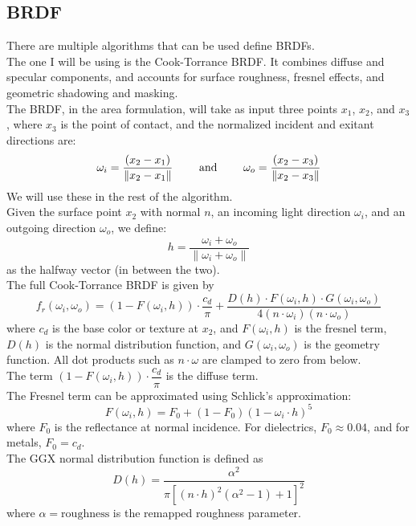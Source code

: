\documentclass[12pt]{article}
\begin{document}
\newpage

\subsection*{BRDF}

There are multiple algorithms that can be used define
BRDFs. \\
The one I will be using is the Cook-Torrance BRDF.
It combines diffuse and specular components, 
and accounts for surface roughness, 
fresnel effects, and geometric shadowing and masking. \\

The BRDF, in the area formulation, will take as input
three points $x_1$, $x_2$, and $x_3$,
where $x_3$ is the point of contact, and
the normalized incident and exitant directions are:
\[ \omega_i = \dfrac{(x_2 - x_1)}{\|x_2 - x_1\|} 
\qquad \text{ and } \qquad 
\omega_o = \dfrac{(x_2 - x_3)}{\|x_2 - x_3\|} \]
We will use these in the rest of the algorithm. \\

Given the surface point $x_2$ with normal $n$, 
an incoming light direction $\omega_i$, 
and an outgoing direction $\omega_o$, 
we define:
\[ h = \frac{\omega_i + \omega_o}
{\|\omega_i + \omega_o\|} \]
as the halfway vector (in between the two). \\

The full Cook-Torrance BRDF is given by
\[f_r(\omega_i, \omega_o) = (1 - F(\omega_i, h)) 
\cdot \frac{c_d}{\pi}
+ \frac{D(h) \cdot F(\omega_i, h) \cdot 
G(\omega_i, \omega_o)}{4 (n \cdot \omega_i)
(n \cdot \omega_o)} \]
where $c_d$ is the base color or texture at $x_2$, 
and $ F(\omega_i, h)$ is the fresnel term, 
$D(h)$ is the normal distribution function, 
and $ G(\omega_i, \omega_o) $ is the geometry function. 
All dot products such as $ n \cdot \omega $ 
are clamped to zero from below. \\

The term $(1 - F(\omega_i, h)) 
\cdot \dfrac{c_d}{\pi}$ is the diffuse term. \\

The Fresnel term can be approximated using 
Schlick's approximation:
\[ F(\omega_i, h) = F_0 + (1 - F_0)
(1 - \omega_i \cdot h)^5 \]
where $F_0$ is the reflectance at normal incidence. 
For dielectrics, $F_0 \approx 0.04$, 
and for metals, $F_0 = c_d$. \\

The GGX normal distribution function is defined as
\[ D(h) = \frac{\alpha^2}{\pi \left[ 
(n \cdot h)^2 (\alpha^2 - 1) + 1 \right]^2} \]
where $\alpha = \text{roughness}$ 
is the remapped roughness parameter. \\
\end{document}
